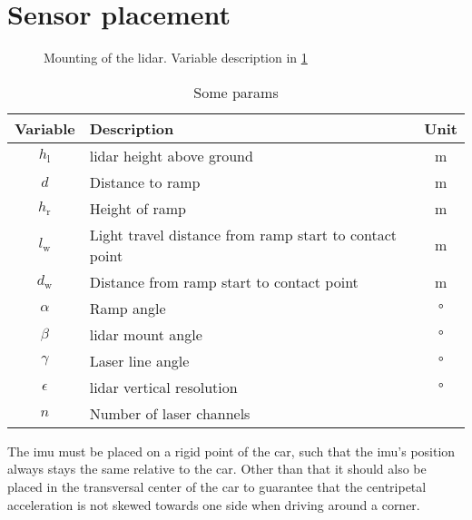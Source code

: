 \section{Sensor placement}
\begin{figure}[htpb]
	\centering
	
	\caption{Mounting of the \acrshort{lidar}. Variable description in \cref{tab:lidar_mount}}
	\label{fig:tikz_lidar_mount}
\end{figure}
\begin{table}[htbp]
	\centering
	\caption{Some params}
	\label{tab:lidar_mount}
	\begin{tabular}[t]{clc}
		\toprule
		\textbf{Variable} & \textbf{Description}                                   & \textbf{Unit} \\
		\midrule
		$h_\mathrm{l} $   & \gls{lidar} height above ground                        & \si{\metre}   \\
		$d$               & Distance to ramp                                       & \si{\metre}   \\
		$h_\mathrm{r}$    & Height of ramp                                         & \si{\metre}   \\
		$l_\mathrm{w}$    & Light travel distance from ramp start to contact point & \si{\metre}   \\
		$d_\mathrm{w}$    & Distance from ramp start to contact point              & \si{\metre}   \\
		$\alpha$          & Ramp angle                                             & \si{\degree}  \\
		$\beta$           & \gls{lidar} mount angle                                & \si{\degree}  \\
		$\gamma$          & Laser line angle                                       & \si{\degree}  \\
		$\epsilon$        & \gls{lidar} vertical resolution                        & \si{\degree}  \\
		$n$               & Number of laser channels                               &               \\
		\bottomrule
	\end{tabular}
\end{table}
The \gls{imu} must be placed on a rigid point of the car, such that the \gls{imu}'s position always stays the same relative to the car.
Other than that it should also be placed in the transversal center of the car to guarantee that the centripetal acceleration is not skewed towards one side when driving around a corner.
